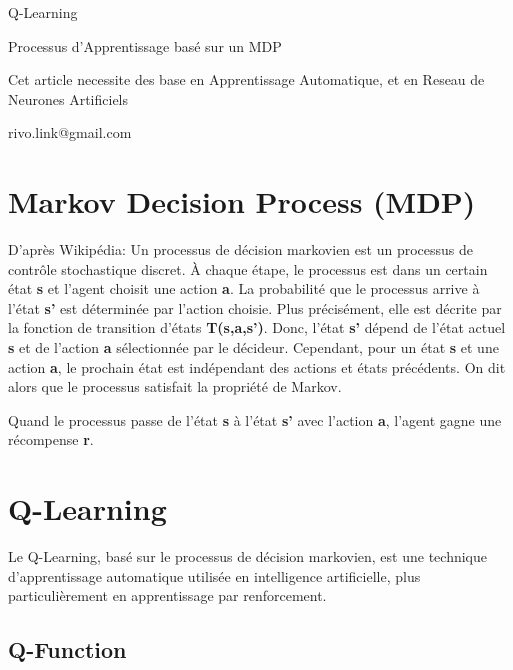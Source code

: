 \documentclass{article}
\begin{document}
\vspace*{\fill}
\begingroup
\centering

Q-Learning

\vspace{3mm}
Processus d'Apprentissage basé sur un MDP

\vspace{5mm} 
Cet article necessite des base en Apprentissage Automatique, et en Reseau de Neurones Artificiels

\vspace{5mm} 
rivo.link@gmail.com

\endgroup
\vspace*{\fill}

\newpage

\section{Markov Decision Process (MDP)}

D'après Wikipédia: Un processus de décision markovien est un processus de contrôle stochastique discret. À chaque étape, le processus est dans un certain état \textbf{s} et l'agent choisit une action \textbf{a}. La probabilité que le processus arrive à l'état \textbf{s'} est déterminée par l'action choisie. Plus précisément, elle est décrite par la fonction de transition d'états \textbf{T(s,a,s')}. Donc, l'état \textbf{s'} dépend de l'état actuel \textbf{s} et de l'action \textbf{a} sélectionnée par le décideur. Cependant, pour un état \textbf{s} et une action \textbf{a}, le prochain état est indépendant des actions et états précédents. On dit alors que le processus satisfait la propriété de Markov. 
\newline

Quand le processus passe de l'état \textbf{s} à l'état \textbf{s'} avec l'action \textbf{a}, l'agent gagne une récompense \textbf{r}. 

\section{Q-Learning}

Le Q-Learning, basé sur le processus de décision markovien, est une technique d'apprentissage automatique utilisée en intelligence artificielle, plus particulièrement en apprentissage par renforcement.

\subsection{Q-Function}
\end{document}
